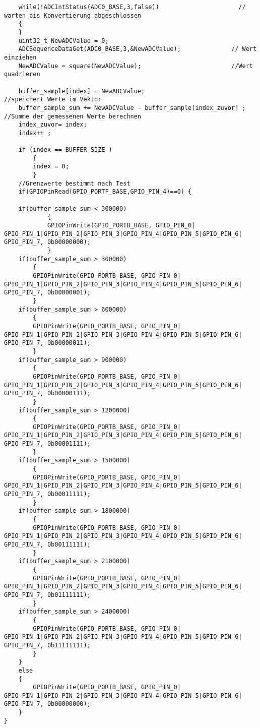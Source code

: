 \begin{lstlisting}
    while(!ADCIntStatus(ADC0_BASE,3,false))                      // warten bis Konvertierung abgeschlossen
    {
    }
    uint32_t NewADCValue = 0;
    ADCSequenceDataGet(ADC0_BASE,3,&NewADCValue);              // Wert einziehen
    NewADCValue = square(NewADCValue);                         //Wert quadrieren

    buffer_sample[index] = NewADCValue;                                 //speichert Werte im Vektor
    buffer_sample_sum += NewADCValue - buffer_sample[index_zuvor] ;     //Summe der gemessenen Werte berechnen
    index_zuvor= index;
    index++ ;

    if (index == BUFFER_SIZE )
        {
        index = 0;
        }
    //Grenzwerte bestimmt nach Test
    if(GPIOPinRead(GPIO_PORTF_BASE,GPIO_PIN_4)==0) {

    if(buffer_sample_sum < 300000)
            {
            GPIOPinWrite(GPIO_PORTB_BASE, GPIO_PIN_0| GPIO_PIN_1|GPIO_PIN_2|GPIO_PIN_3|GPIO_PIN_4|GPIO_PIN_5|GPIO_PIN_6| GPIO_PIN_7, 0b00000000);
            }
    if(buffer_sample_sum > 300000)
        {
        GPIOPinWrite(GPIO_PORTB_BASE, GPIO_PIN_0| GPIO_PIN_1|GPIO_PIN_2|GPIO_PIN_3|GPIO_PIN_4|GPIO_PIN_5|GPIO_PIN_6| GPIO_PIN_7, 0b00000001);
        }
    if(buffer_sample_sum > 600000)
        {
        GPIOPinWrite(GPIO_PORTB_BASE, GPIO_PIN_0| GPIO_PIN_1|GPIO_PIN_2|GPIO_PIN_3|GPIO_PIN_4|GPIO_PIN_5|GPIO_PIN_6| GPIO_PIN_7, 0b00000011);
        }
    if(buffer_sample_sum > 900000)
        {
        GPIOPinWrite(GPIO_PORTB_BASE, GPIO_PIN_0| GPIO_PIN_1|GPIO_PIN_2|GPIO_PIN_3|GPIO_PIN_4|GPIO_PIN_5|GPIO_PIN_6| GPIO_PIN_7, 0b00000111);
        }
    if(buffer_sample_sum > 1200000)
        {
        GPIOPinWrite(GPIO_PORTB_BASE, GPIO_PIN_0| GPIO_PIN_1|GPIO_PIN_2|GPIO_PIN_3|GPIO_PIN_4|GPIO_PIN_5|GPIO_PIN_6| GPIO_PIN_7, 0b00001111);
        }
    if(buffer_sample_sum > 1500000)
        {
        GPIOPinWrite(GPIO_PORTB_BASE, GPIO_PIN_0| GPIO_PIN_1|GPIO_PIN_2|GPIO_PIN_3|GPIO_PIN_4|GPIO_PIN_5|GPIO_PIN_6| GPIO_PIN_7, 0b00011111);
        }
    if(buffer_sample_sum > 1800000)
        {
        GPIOPinWrite(GPIO_PORTB_BASE, GPIO_PIN_0| GPIO_PIN_1|GPIO_PIN_2|GPIO_PIN_3|GPIO_PIN_4|GPIO_PIN_5|GPIO_PIN_6| GPIO_PIN_7, 0b00111111);
        }
    if(buffer_sample_sum > 2100000)
        {
        GPIOPinWrite(GPIO_PORTB_BASE, GPIO_PIN_0| GPIO_PIN_1|GPIO_PIN_2|GPIO_PIN_3|GPIO_PIN_4|GPIO_PIN_5|GPIO_PIN_6| GPIO_PIN_7, 0b01111111);
        }
    if(buffer_sample_sum > 2400000)
        {
        GPIOPinWrite(GPIO_PORTB_BASE, GPIO_PIN_0| GPIO_PIN_1|GPIO_PIN_2|GPIO_PIN_3|GPIO_PIN_4|GPIO_PIN_5|GPIO_PIN_6| GPIO_PIN_7, 0b11111111);
        }
    }
    else
    {
        GPIOPinWrite(GPIO_PORTB_BASE, GPIO_PIN_0| GPIO_PIN_1|GPIO_PIN_2|GPIO_PIN_3|GPIO_PIN_4|GPIO_PIN_5|GPIO_PIN_6| GPIO_PIN_7, 0b00000000);
    }
}
\end{lstlisting}
